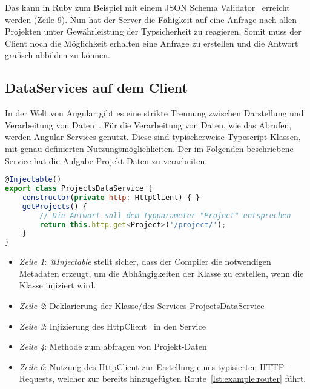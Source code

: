 Das kann in Ruby zum Beispiel mit einem JSON Schema Validator~\cite{json-schemer} erreicht werden (Zeile 9).
Nun hat der Server die Fähigkeit auf eine Anfrage nach allen Projekten unter Gewährleistung der Typsicherheit zu reagieren.
Somit muss der Client noch die Möglichkeit erhalten eine Anfrage zu erstellen und die Antwort grafisch abbilden zu können.

\subsection{DataServices auf dem Client}
\label{sec:requirements:example:service}
In der Welt von Angular gibt es eine strikte Trennung zwischen Darstellung und Verarbeitung von Daten~\cite{angular-service}.
Für die Verarbeitung von Daten, wie das Abrufen, werden Angular Services genutzt. Diese sind typischerweise Typescript Klassen,
mit genau definierten Nutzungsmöglichkeiten. Der im Folgenden beschriebene Service hat die Aufgabe Projekt-Daten zu verarbeiten.

\begin{lstlisting}[language=JavaScript,float=h!,caption={Funktion zum Abruf aller Projekte vom Server}, label={lst:example:service}]
@Injectable()
export class ProjectsDataService {
    constructor(private http: HttpClient) { }
    getProjects() {
        // Die Antwort soll dem Typparameter "Project" entsprechen
        return this.http.get<Project>('/project/');
    }
}
\end{lstlisting}

\begin{itemize}
    \setlength\itemsep{-1em}
    \item \emph{Zeile 1}: \emph{@Injectable} stellt sicher, dass der Compiler die notwendigen Metadaten erzeugt, um die Abhängigkeiten der Klasse zu erstellen, wenn die Klasse injiziert wird.
    \item \emph{Zeile 2}: Deklarierung der Klasse/des Services ProjectsDataService
    \item \emph{Zeile 3}: Injizierung des HttpClient~\cite{angular-http} in den Service
    \item \emph{Zeile 4}: Methode zum abfragen von Projekt-Daten
    \item \emph{Zeile 6}: Nutzung des HttpClient zur Erstellung eines typisierten HTTP-Requests, welcher zur bereits hinzugefügten Route~\ref{lst:example:router} führt.
\end{itemize}

